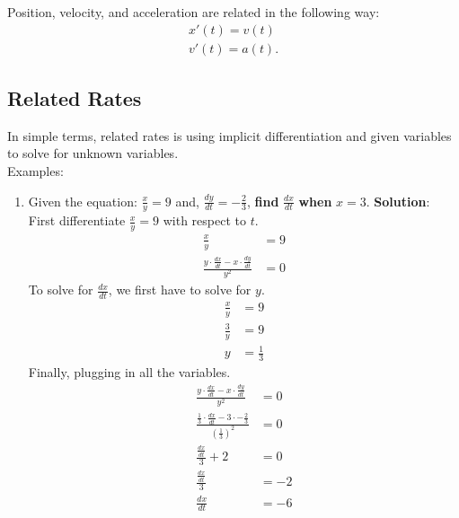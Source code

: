 \documentclass[12pt]{article}
\begin{document}
            Position, velocity, and acceleration are related in the following way:
            \begin{gather*}
                x'(t) = v(t) \\
                v'(t) = a(t).
            \end{gather*}

        \subsection{Related Rates}
            In simple terms, related rates is using implicit differentiation and given variables to solve for unknown variables. %
            \\ Examples:
            \begin{enumerate}
                \item Given the equation: $\frac{x}{y} = 9$ and, $\frac{dy}{dt} = -\frac{2}{3}$, \textbf{find} $\frac{dx}{dt}$ \textbf{when} $x=3$.
                \newline \newline
                \textbf{Solution}:
                \\ First differentiate $\frac{x}{y} = 9$ with respect to $t$.
                \begin{align*}
                    \frac{x}{y} &= 9 \\[6pt]
                    \frac{y \cdot \frac{dx}{dt} - x \cdot \frac{dy}{dt}}{y^2} &= 0
                \end{align*}
                To solve for $\frac{dx}{dt}$, we first have to solve for $y$.
                \begin{align*}
                    \frac{x}{y} &= 9 \\[6pt]
                    \frac{3}{y} &= 9 \\[6pt]
                    y &= \frac{1}{3}
                \end{align*}
                Finally, plugging in all the variables.
                \begin{align*}
                    \frac{y \cdot \frac{dx}{dt} - x \cdot \frac{dy}{dt}}{y^2} &= 0 \\[6pt]
                    \frac{\frac{1}{3} \cdot \frac{dx}{dt} - 3 \cdot -\frac{2}{3}}{\left( \frac{1}{3} \right)^2} &= 0 \\[6pt]
                    \frac{\frac{dx}{dt} }{3} + 2 &= 0 \\[6pt]
                    \frac{\frac{dx}{dt}}{3} &= -2 \\[6pt]
                    \frac{dx}{dt} &= -6
                \end{align*}


\end{enumerate}
\end{document}
